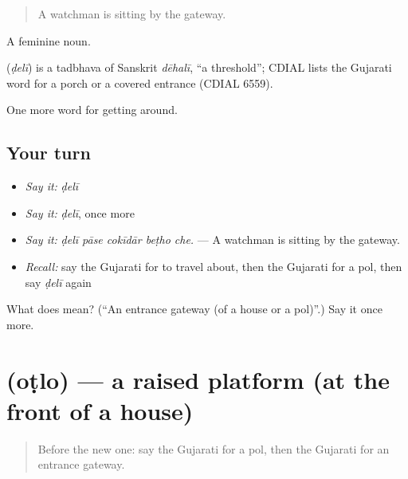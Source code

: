 \begin{quote}
A watchman is sitting by the gateway.
\end{quote}

A feminine noun.

\begin{cousinweb}
\textbf{} (\emph{ḍelī}) is a tadbhava of Sanskrit \emph{dēhalī}, \textquotedblleft{}a threshold\textquotedblright{}; CDIAL lists the Gujarati word for a porch or a covered entrance (CDIAL 6559).
\end{cousinweb}

\begin{grammarlens}[title={What you've built}]
One more word for getting around.
\end{grammarlens}

\subsection*{Your turn}
\begin{itemize}
\raggedright
  \item \emph{Say it:} \emph{ḍelī}
  \item \emph{Say it:} \emph{ḍelī}, once more
  \item \emph{Say it:} \emph{ḍelī pāse cokīdār beṭho che.} — A watchman is sitting by the gateway.
  \item \emph{Recall:} say the Gujarati for to travel about, then the Gujarati for a pol, then say \emph{ḍelī} again
\end{itemize}

\begin{tcolorbox}[breakable,colback=teal!4,colframe=teal!35!black,title={Before you move on}]
What does  mean? (\textquotedblleft{}An entrance gateway (of a house or a pol)\textquotedblright{}.) Say it once more.
\end{tcolorbox}
\section[\texorpdfstring{\gu{ઓટલો} (oṭlo)}{ઓટલો (oṭlo)}]{ (oṭlo) — a raised platform (at the front of a house)}

\label{lesson:GU-C417-otlo}



\begin{quote}
Before the new one: say the Gujarati for a pol, then the Gujarati for an entrance gateway.
\end{quote}

